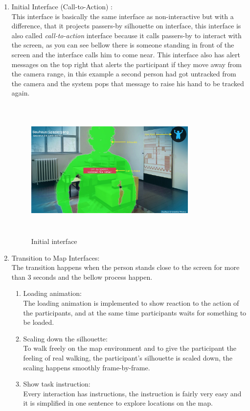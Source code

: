 \begin{enumerate}

\item Initial Interface (Call-to-Action) : \\
This interface is basically the same interface as non-interactive but with a difference, that it projects passers-by silhouette on interface, this interface is also called \emph{call-to-action} interface because it calls passers-by to interact with the screen, as you can see bellow there is someone standing in front of the screen and the interface calls him to come near. This interface also has alert messages on the top right that alerts the participant if they move away from the camera range, in this example a second person had got untracked from the camera and the system pops that message to raise his hand to be tracked again.

\begin{figure}[H]
    \centering
    \includegraphics[width=0.8\textwidth,height=70mm]{Figures/7/body_interactive/first_interface}
    \caption{Initial interface}%
    \label{fig:body_firstinterface}%
\end{figure}


\item Transition to Map Interfaces: \\
The transition happens when the person stands close to the screen for more than 3 seconds and the bellow process happen.

\begin{enumerate}
\item Loading animation:\\
  The loading animation is implemented to show reaction to the action of the participants, and at the same time participants waits for something to be loaded.
\item Scaling down the silhouette: \\
To walk freely on the map environment and to give the participant the feeling of real walking, the participant's silhouette is scaled down, the scaling happens smoothly frame-by-frame.
\item Show task instruction:  \\
Every interaction has instructions, the instruction is fairly very easy and it is simplified in one sentence to explore locations on the map.
\end{enumerate}


\end{enumerate}
